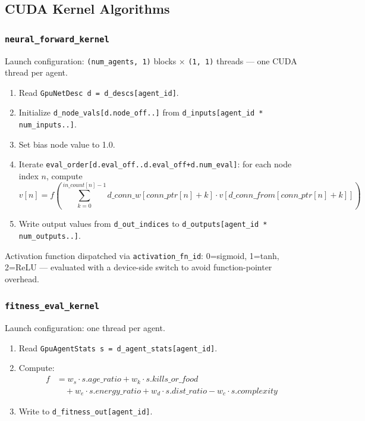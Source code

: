 \subsection{CUDA Kernel Algorithms}

\subsubsection{\texttt{neural\_forward\_kernel}}

Launch configuration: \texttt{(num\_agents, 1)} blocks × \texttt{(1, 1)} threads —
one CUDA thread per agent.

\begin{enumerate}[nosep]
  \item Read \texttt{GpuNetDesc d = d\_descs[agent\_id]}.
  \item Initialize \texttt{d\_node\_vals[d.node\_off..]} from \texttt{d\_inputs[agent\_id * num\_inputs..]}.
  \item Set bias node value to 1.0.
  \item Iterate \texttt{eval\_order[d.eval\_off..d.eval\_off+d.num\_eval]}:
    for each node index $n$, compute
    \[
      v[n] = f\!\left(\sum_{k=0}^{\mathit{in\_count}[n]-1}
             d\_conn\_w[\mathit{conn\_ptr}[n]+k] \cdot v[d\_conn\_from[\mathit{conn\_ptr}[n]+k]]\right)
    \]
  \item Write output values from \texttt{d\_out\_indices} to
    \texttt{d\_outputs[agent\_id * num\_outputs..]}.
\end{enumerate}

Activation function dispatched via \texttt{activation\_fn\_id}: 0=sigmoid, 1=tanh,
2=ReLU — evaluated with a device-side switch to avoid function-pointer overhead.

\subsubsection{\texttt{fitness\_eval\_kernel}}

Launch configuration: one thread per agent.

\begin{enumerate}[nosep]
  \item Read \texttt{GpuAgentStats s = d\_agent\_stats[agent\_id]}.
  \item Compute:
    \[
      \begin{aligned}
        f &= w_s \cdot s.\mathit{age\_ratio} + w_k \cdot s.\mathit{kills\_or\_food} \\
          &\quad + w_e \cdot s.\mathit{energy\_ratio} + w_d \cdot s.\mathit{dist\_ratio} - w_c \cdot s.\mathit{complexity}
      \end{aligned}
    \]
  \item Write to \texttt{d\_fitness\_out[agent\_id]}.
\end{enumerate}


